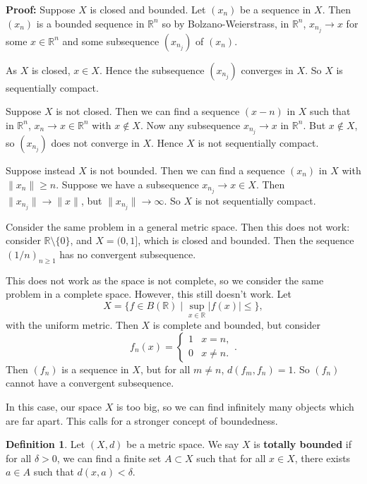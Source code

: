 \documentclass[12pt]{article}
\theoremstyle{definition}
\newtheorem{definition}{Definition}[section]
\theoremstyle{remark}
\begin{document}
\begin{adjustbox}{minipage = \columnwidth - 25.5pt, margin=1em, frame=1pt, margin=0em}
	\textbf{Proof:} Suppose $X$ is closed and bounded. Let $(x_n)$ be a sequence in $X$. Then $(x_n)$ is a bounded sequence in $\mathbb{R}^{n}$ so by Bolzano-Weierstrass, in $\mathbb{R}^{n}$, $x_{n_j} \to x$ for some $x \in \mathbb{R}^{n}$ and some subsequence $(x_{n_j})$ of $(x_n)$. 

	As $X$ is closed, $x \in X$. Hence the subsequence $(x_{n_j})$ converges in $X$. So $X$ is sequentially compact.

	Suppose $X$ is not closed. Then we can find a sequence $(x-n)$ in $X$ such that in $\mathbb{R}^{n}$, $x_n \to x \in \mathbb{R}^{n}$ with $x \not \in X$. Now any subsequence $x_{n_j} \to x$ in $\mathbb{R}^{n}$. But $x \not \in X$, so $(x_{n_j})$ does not converge in $X$. Hence $X$ is not sequentially compact.

	Suppose instead $X$ is not bounded. Then we can find a sequence $(x_n)$ in $X$ with $\|x_n\| \geq n$. Suppose we have a subsequence $x_{n_j}\to x \in X$. Then $\|x_{n_j}\| \to \|x\|$, but $\|x_{n_j}\| \to \infty$. So $X$ is not sequentially compact.
\end{adjustbox}

Consider the same problem in a general metric space. Then this does not work: consider $\mathbb{R} \setminus \{0\}$, and $X = (0, 1]$, which is closed and bounded. Then the sequence $(1/n)_{n\geq 1}$ has no convergent subsequence.

This does not work as the space is not complete, so we consider the same problem in a complete space. However, this still doesn't work. Let
\[
	X = \{f \in B(\mathbb{R}) \mid \sup_{x \in \mathbb{R}}|f(x)| \leq \}
,\]
with the uniform metric. Then $X$ is complete and bounded, but consider
\[
	f_n(x) =
	\begin{cases}
		1 & x = n, \\
		0 & x \neq n.
	\end{cases}
.\]
Then $(f_n)$ is a sequence in $X$, but for all $m \neq n$, $d(f_m, f_n) = 1$. So $(f_n)$ cannot have a convergent subsequence.

In this case, our space $X$ is too big, so we can find infinitely many objects which are far apart. This calls for a stronger concept of boundedness.

\begin{definition}
	Let $(X, d)$ be a metric space. We say $X$ is \textbf{totally bounded} if for all $\delta > 0$, we can find a finite set $A \subset X$ such that for all $x \in X$, there exists $a \in A$ such that $d(x, a) < \delta$.
\end{definition}
\end{document}
